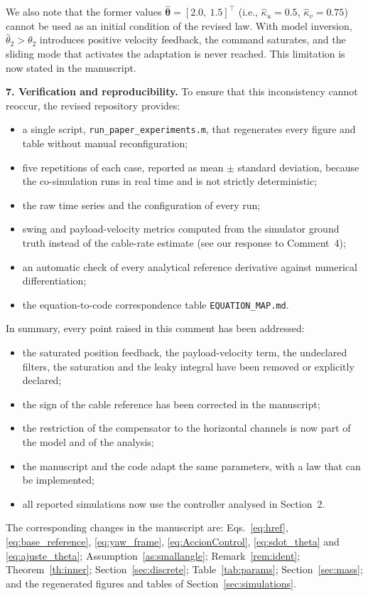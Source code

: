 \begin{reply}
We also note that the former values $\hat{\boldsymbol{\theta}}=[2.0,\ 1.5]^\top$ (i.e., $\hat\kappa_u=0.5$, $\hat\kappa_v=0.75$) cannot be used as an initial condition of the revised law. With model inversion, $\hat\theta_2>\theta_2$ introduces positive velocity feedback, the command saturates, and the sliding mode that activates the adaptation is never reached. This limitation is now stated in the manuscript.

\medskip
\noindent\textbf{7. Verification and reproducibility.}
To ensure that this inconsistency cannot reoccur, the revised repository provides:
\begin{itemize}
\item a single script, \texttt{run\_paper\_experiments.m}, that regenerates every figure and table without manual reconfiguration;
\item five repetitions of each case, reported as mean $\pm$ standard deviation, because the co-simulation runs in real time and is not strictly deterministic;
\item the raw time series and the configuration of every run;
\item swing and payload-velocity metrics computed from the simulator ground truth instead of the cable-rate estimate (see our response to Comment~4);
\item an automatic check of every analytical reference derivative against numerical differentiation;
\item the equation-to-code correspondence table \texttt{EQUATION\_MAP.md}.
\end{itemize}

\medskip
In summary, every point raised in this comment has been addressed:
\begin{itemize}
\item the saturated position feedback, the payload-velocity term, the undeclared filters, the saturation and the leaky integral have been removed or explicitly declared;
\item the sign of the cable reference has been corrected in the manuscript;
\item the restriction of the compensator to the horizontal channels is now part of the model and of the analysis;
\item the manuscript and the code adapt the same parameters, with a law that can be implemented;
\item all reported simulations now use the controller analysed in Section~2.
\end{itemize}
The corresponding changes in the manuscript are: Eqs.~\eqref{eq:href}, \eqref{eq:base_reference}, \eqref{eq:yaw_frame}, \eqref{eq:AccionControl}, \eqref{eq:sdot_theta} and \eqref{eq:ajuste_theta}; Assumption~\ref{as:smallangle}; Remark~\ref{rem:ident}; Theorem~\ref{th:inner}; Section~\ref{sec:discrete}; Table~\ref{tab:params}; Section~\ref{sec:mass}; and the regenerated figures and tables of Section~\ref{sec:simulations}.
\end{reply}
